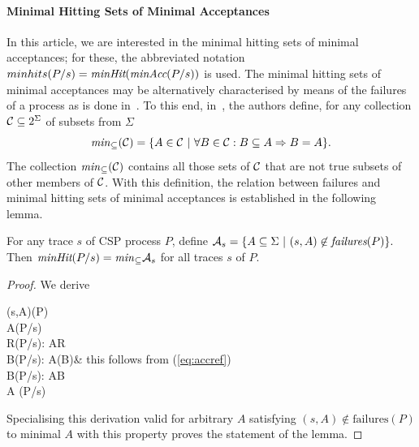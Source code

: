 \paragraph{Minimal Hitting Sets of Minimal Acceptances} In this article, we are
interested in the minimal hitting sets of minimal acceptances; for these, the
abbreviated notation
$%
minhits(P/s) = \minhits(\minaccs(P/s))
$ %
is used. The minimal hitting sets
of minimal acceptances may be alternatively characterised by means of the
failures of a process as is done in~\cite{DBLP:conf/icfem/CavalcantiG07}. To
this end, in~\cite{DBLP:conf/icfem/CavalcantiG07}, the authors define, for
any collection ${\cal C}\subseteq 2^\Sigma$ of subsets from $\Sigma$
\begin{equation}\label{eq:minsub}
{\it min}_\subseteq({\cal C}) = \{ A\in {\cal C}~|~\forall B\in {\cal C}:
B\subseteq A\Rightarrow B = A \}.
\end{equation}
The collection ${\it min}_\subseteq({\cal C})$ contains all those sets of
${\cal C}$ that are not true subsets of other members of ${\cal C}$. With
this definition, the relation between failures and minimal hitting sets of
minimal acceptances is established in the following lemma.
%
\begin{lemma}
\label{lemma:failureshittingsets}
For any trace $s$ of CSP process $P$, define
$%
{\cal A}_s = \{ A\subseteq \Sigma~|~(s,A)\not\in\fails(P)  \}.
$ %
Then
$ %
\minhits(P/s) = \minsub {\cal A}_s
$ %
for all traces $s$ of $P$.
\end{lemma}
\begin{proof}
We derive
\begin{argue}
(s,A)\not{}(P)
\\
\Leftrightarrow A\not{}(P/s)
\\
\Leftrightarrow  \forall R(P/s): A\not\subseteq R
\\
\Leftrightarrow   \forall B(P/s): A\not\subseteq (\Sigma\setminus B)& this follows from (\ref{eq:accref})
\\
\Leftrightarrow  \forall B(P/s): A\cap B\neq \varnothing
\\
\Leftrightarrow  A 
               {}(P/s)
\end{argue}
%
Specialising this derivation valid for arbitrary $A$ satisfying $(s,A)\not\in {\text{failures}}(P)$ to
minimal $A$ with this property proves the statement of the lemma.
\xbox
\end{proof}

